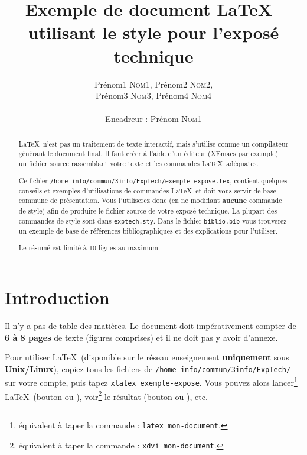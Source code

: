 \documentclass[a4paper,11pt]{article}
\title{ \textbf{Exemple de document \LaTeX\ \\
    utilisant le style pour l'exposé technique} }
\author{Prénom1 \textsc{Nom1}, Prénom2 \textsc{Nom2}, \\
        Prénom3 \textsc{Nom3}, Prénom4 \textsc{Nom4} \\
        \\
        Encadreur : Prénom \textsc{Nom1}}
\date{}                    %
\begin{document}
          

\maketitle                 %
\thispagestyle{empty}      %



\begin{abstract}
\LaTeX\ n'est pas un traitement de texte interactif, mais s'utilise comme un
compilateur générant le document final. 
Il faut créer à l'aide d'un éditeur (XEmacs par exemple)
un fichier source rassemblant votre texte et les commandes \LaTeX\
adéquates.
 
Ce fichier
\texttt{/home-info/commun/3info/ExpTech/exemple-expose.tex},
contient quelques conseils et exemples d'utilisations de commandes
\LaTeX\ et doit vous servir de base commune de présentation. Vous
l'utiliserez donc (en ne modifiant \textbf{aucune} commande de style) afin de
produire le fichier source de votre exposé technique. 
La plupart des commandes de style sont dans \texttt{exptech.sty}. Dans
le fichier \texttt{biblio.bib} vous trouverez un exemple de base de
références bibliographiques et des explications pour l'utiliser.

Le résumé est limité à 10 lignes au maximum.
\end{abstract} 


\section{Introduction}  

Il n'y a pas de table des matières. Le document doit impérativement
compter de \textbf{6 à 8 pages} de texte (figures comprises) et il ne
doit pas y avoir d'annexe.

Pour utiliser \LaTeX\ (disponible sur le réseau enseignement
\textbf{uniquement} sous \textbf{Unix/Linux}), copiez tous les fichiers de
\texttt{/home-info/commun/3info/ExpTech/} sur votre compte, puis 
tapez \texttt{xlatex exemple-expose}. Vous pouvez alors
lancer\footnote{équivalent à taper la commande : \texttt{latex mon-document}.}
\LaTeX\ (bouton \fbox{\textsf{Façonner}} 
ou ), 
voir\footnote{équivalent à taper la commande : \texttt{xdvi mon-document}.}
le résultat (bouton \fbox{\textsf{Visionner}}
ou ), etc.
\end{document}
